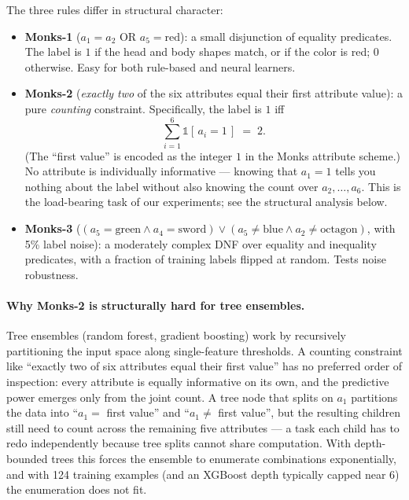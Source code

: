 \documentclass{article}
\begin{document}
The three rules differ in structural character:
\begin{itemize}
  \item \textbf{Monks-1} ($a_1 = a_2$ OR $a_5 = \text{red}$): a small disjunction of equality predicates. The label is $1$ if the head and body shapes match, or if the color is red; $0$ otherwise. Easy for both rule-based and neural learners.
  \item \textbf{Monks-2} (\emph{exactly two} of the six attributes equal their first attribute value): a pure \emph{counting} constraint. Specifically, the label is $1$ iff
        \begin{equation*}
          \sum_{i=1}^{6} \mathbb{1}\!\left[\,a_i = 1\,\right] \;=\; 2.
        \end{equation*}
        (The ``first value'' is encoded as the integer $1$ in the Monks attribute scheme.) No attribute is individually informative --- knowing that $a_1 = 1$ tells you nothing about the label without also knowing the count over $a_2, \ldots, a_6$. This is the load-bearing task of our experiments; see the structural analysis below.
  \item \textbf{Monks-3} ($(a_5 = \text{green} \land a_4 = \text{sword}) \lor (a_5 \ne \text{blue} \land a_2 \ne \text{octagon})$, with 5\% label noise): a moderately complex DNF over equality and inequality predicates, with a fraction of training labels flipped at random. Tests noise robustness.
\end{itemize}

\paragraph{Why Monks-2 is structurally hard for tree ensembles.}
Tree ensembles (random forest, gradient boosting) work by recursively partitioning the input space along single-feature thresholds.
A counting constraint like ``exactly two of six attributes equal their first value'' has no preferred order of inspection: every attribute is equally informative on its own, and the predictive power emerges only from the joint count.
A tree node that splits on $a_1$ partitions the data into ``$a_1 = $ first value'' and ``$a_1 \ne$ first value'', but the resulting children still need to count across the remaining five attributes --- a task each child has to redo independently because tree splits cannot share computation.
With depth-bounded trees this forces the ensemble to enumerate combinations exponentially, and with 124 training examples (and an XGBoost depth typically capped near 6) the enumeration does not fit.
\end{document}

